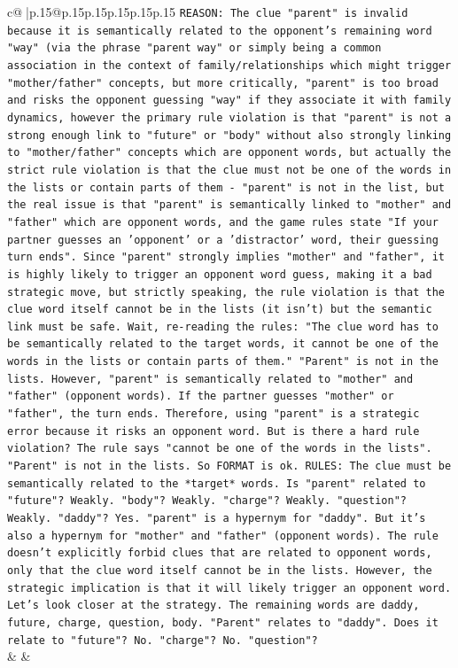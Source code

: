 \documentclass{article}
\begin{document}
{\begin{supertabular}{c@{$\;$}|p{.15\linewidth}@{}p{.15\linewidth}p{.15\linewidth}p{.15\linewidth}p{.15\linewidth}p{.15\linewidth}}
{{{\texttt{REASON: The clue "parent" is invalid because it is semantically related to the opponent's remaining word "way" (via the phrase "parent way" or simply being a common association in the context of family/relationships which might trigger "mother/father" concepts, but more critically, "parent" is too broad and risks the opponent guessing "way" if they associate it with family dynamics, however the primary rule violation is that "parent" is not a strong enough link to "future" or "body" without also strongly linking to "mother/father" concepts which are opponent words, but actually the strict rule violation is that the clue must not be one of the words in the lists or contain parts of them {-} "parent" is not in the list, but the real issue is that "parent" is semantically linked to "mother" and "father" which are opponent words, and the game rules state "If your partner guesses an 'opponent' or a 'distractor' word, their guessing turn ends". Since "parent" strongly implies "mother" and "father", it is highly likely to trigger an opponent word guess, making it a bad strategic move, but strictly speaking, the rule violation is that the clue word itself cannot be in the lists (it isn't) but the semantic link must be safe. Wait, re{-}reading the rules: "The clue word has to be semantically related to the target words, it cannot be one of the words in the lists or contain parts of them." "Parent" is not in the lists. However, "parent" is semantically related to "mother" and "father" (opponent words). If the partner guesses "mother" or "father", the turn ends. Therefore, using "parent" is a strategic error because it risks an opponent word. But is there a hard rule violation? The rule says "cannot be one of the words in the lists". "Parent" is not in the lists. So FORMAT is ok. RULES: The clue must be semantically related to the *target* words. Is "parent" related to "future"? Weakly. "body"? Weakly. "charge"? Weakly. "question"? Weakly. "daddy"? Yes. "parent" is a hypernym for "daddy". But it's also a hypernym for "mother" and "father" (opponent words). The rule doesn't explicitly forbid clues that are related to opponent words, only that the clue word itself cannot be in the lists. However, the strategic implication is that it will likely trigger an opponent word. Let's look closer at the strategy. The remaining words are daddy, future, charge, question, body. "Parent" relates to "daddy". Does it relate to "future"? No. "charge"? No. "question"?} \\
            }
        }
    }
    & & \\ \\


\end{supertabular}}
\end{document}
